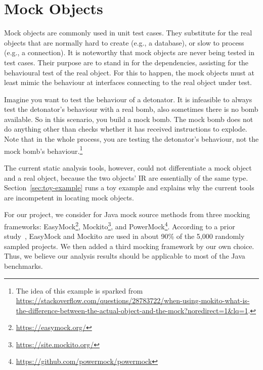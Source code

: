 \section{Mock Objects} 

Mock objects are commonly used in unit test cases. They substitute for the real objects that are normally hard to create (e.g., a database), or slow to process (e.g., a connection). It is noteworthy that mock objects are never being tested in test cases. Their purpose are to stand in for the dependencies, assisting for the behavioural test of the real object. For this to happen, the mock objects must at least mimic the behaviour at interfaces connecting to the real object under test.

Imagine you want to test the behaviour of a detonator. It is infeasible to always test the detonator's behaviour with a real bomb, also sometimes there is no bomb available. So in this scenario, you build a mock bomb. The mock bomb does not do anything other than checks whether it has received instructions to explode. Note that in the whole process, you are testing the detonator's behaviour, not the mock bomb's behaviour.\footnote{The idea of this example is sparked from \url{https://stackoverflow.com/questions/28783722/when-using-mokito-what-is-the-difference-between-the-actual-object-and-the-mock?noredirect=1&lq=1}.}

The current static analysis tools, however, could not differentiate a mock object and a real object, because the two objects' IR are essentially of the same type. Section~\ref{sec:toy-example} runs a toy example and explains why the current tools are incompetent in locating mock objects.

For our project, we consider for Java mock source methods from three mocking frameworks: EasyMock\footnote{\url{https://easymock.org/}}, Mockito\footnote{\url{https://site.mockito.org/}}, and PowerMock\footnote{\url{https://github.com/powermock/powermock}}. According to a prior study~\cite{mostafa14:_empirical_study_mock_frameworks}, EasyMock and Mockito are used in about 90\% of the 5,000 randomly sampled projects. We then added a third mocking framework by our own choice. Thus, we believe our analysis results should be applicable to most of the Java benchmarks. 